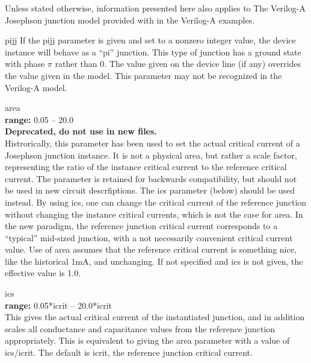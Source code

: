 
Unless stated otherwise, information presented here also applies to
The Verilog-A Josephson junction model provided with {\WRspice} in the
Verilog-A examples.

\begin{description}
\item{\vt pijj}
If the {\vt pijj} parameter is given and set to a nonzero integer
value, the device instance will behave as a ``pi'' junction.  This
type of junction has a ground state with phase $\pi$ rather than 0. 
The value given on the device line (if any) overrides the value given
in the model.  This parameter may not be recognized in the Verilog-A
model.

\item{\vt area}\\
{\bf range:} 0.05 -- 20.0\\
{\bf Deprecated, do not use in new files.}\\
Histrorically, this parameter has been used to set the actual critical
current of a Josephson junction instance.  It is not a physical area,
but rather a scale factor, representing the ratio of the instance
critical current to the reference critical current.  The parameter is
retained for backwards compatibility, but should not be used in new
circuit descrfiptions.  The {\vt ics} parameter (below) should be used
instead.  By using {\vt ics}, one can change the critical current of
the reference junction without changing the instance critical
currents, which is not the case for {\vt area}.  In the new paradigm,
the reference junction critical current corresponds to a ``typical''
mid-sized junction, with a not necessarily convenient critical current
value.  Use of {\vt area} assumes that the reference critical current
is something nice, like the historical 1mA, and unchanging.  If not
specified and {\vt ics} is not given, the effective value is 1.0.

\item{\vt ics}\\
{\bf range:} 0.05*{\vt icrit} -- 20.0*{\vt icrit}\\
This gives the actual critical current of the instantiated junction,
and in addition scales all conductance and capacitance values from the
reference junction appropriately.  This is equivalent to giving the
{\vt area} parameter with a value of {\vt ics}/{\vt icrit}.  The
default is {\vt icrit}, the reference junction critical current.


\end{description}
